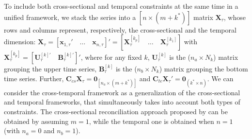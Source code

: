 \documentclass[12pt]{article}
\newcommand{\xvet}{\bm{x}}
\newcommand{\Bvet}{\bm{B}}
\newcommand{\Cvet}{\bm{C}}
\newcommand{\Uvet}{\bm{U}}
\newcommand{\Xvet}{\bm{X}}
\newcommand{\Zerovet}{\bm{0}}
\theoremstyle{definition}
\begin{document}
To include both cross-sectional and temporal constraints at the same time in a unified framework, we stack the series into a $[n \times (m+k^\ast)]$ matrix $\Xvet_\tau$, whose rows and columns represent, respectively, the cross-sectional and the temporal dimension: $\Xvet_\tau = \left[\xvet_{1,\tau}'\quad \dots \quad \xvet_{n,\tau}\right]' = \left[\Xvet_{\tau}^{[k_p]} \quad \dots \quad \Xvet_{\tau}^{[k_1]}\right]$ with $\Xvet_{\tau}^{[k_p]} = \left[\Uvet_{\tau}^{[k]'} \quad
		\Bvet_{\tau}^{[k]'}\right]'$,
where for any fixed $k$,
$\Uvet_{\tau}^{[k]}$ is the ($n_a\times N_k$) matrix grouping the upper time series, $\Bvet_{\tau}^{[k]}$ is the ($n_b\times N_k$) matrix grouping the bottom time series. Further, $\Cvet_{cs}\Xvet_\tau = \Zerovet_{\left[n_a \times (m+k^\ast)\right]}$ and $\Cvet_{te}\Xvet_\tau' = \Zerovet_{(k^\ast \times n)} $. We can consider the cross-temporal framework as a generalization of the cross-sectional and temporal frameworks, that simultaneously takes into account both types of constraints. The cross-sectional reconciliation approach proposed by \cite{hyndman2011} can be obtained by assuming $m = 1$, while the temporal one \citep{athanasopoulos2017} is obtained when $n = 1$ (with $n_a = 0$ and $n_b = 1$).

%
\end{document}
